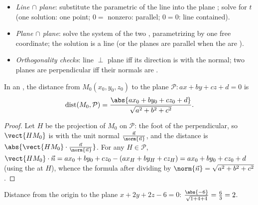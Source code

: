 \begin{method}\label{met:g12:space:intersections}
\begin{itemize}
  \item \emph{Line $\cap$ plane}: substitute the parametric  of
        the line into the plane ; solve for $t$ (one solution: one
        point; $0 = $ nonzero: parallel; $0 = 0$: line contained).
  \item \emph{Plane $\cap$ plane}: solve the system of the two ,
        parametrizing by one free coordinate; the solution is a line (or the
        planes are parallel when the  are ).
  \item \emph{Orthogonality checks}: line $\perp$ plane iff its direction
        is  with the normal; two planes are perpendicular iff their
        normals are .
\end{itemize}
\end{method}

\begin{proposition}\label{prop:g12:space:distance}
In an , the distance from $M_0(x_0, y_0, z_0)$ to the
plane $\mathcal P : ax + by + cz + d = 0$ is
\[
\operatorname{dist}(M_0, \mathcal P)
= \frac{\abs{ax_0 + by_0 + cz_0 + d}}{\sqrt{a^2 + b^2 + c^2}}.
\]
\end{proposition}

\begin{proof}
Let $H$ be the  projection of $M_0$ on $\mathcal P$: the foot of
the perpendicular, so $\vect{HM_0}$ is  with the unit normal
$\frac{\vec n}{\norm{\vec n}}$, and the distance is
$\abs{\vect{HM_0}\cdot \frac{\vec n}{\norm{\vec n}}}$. For any
$H \in \mathcal P$,
$\vect{HM_0}\cdot\vec n = ax_0 + by_0 + cz_0 - (ax_H + by_H + cz_H)
= ax_0 + by_0 + cz_0 + d$ (using the  at $H$), whence the formula
after dividing by $\norm{\vec n} = \sqrt{a^2+b^2+c^2}$.
\end{proof}

\begin{example}\label{ex:g12:space:distance}
Distance from the origin to the plane $x + 2y + 2z - 6 = 0$:
$\frac{\abs{-6}}{\sqrt{1 + 4 + 4}} = \frac63 = 2$.
\end{example}

